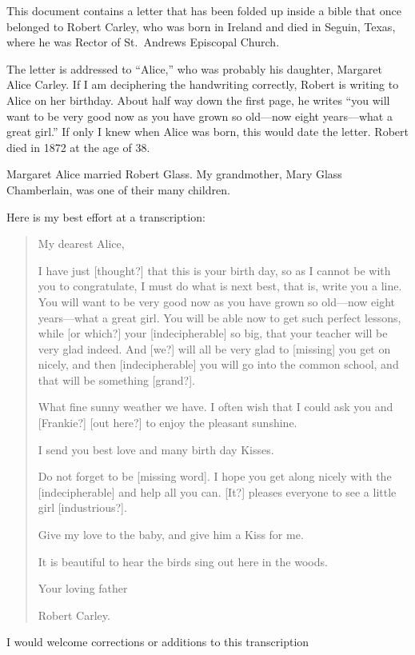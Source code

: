 \documentclass[12pt]{article}
\begin{document}
This document contains a letter that has been folded up inside a bible
that once belonged to Robert Carley, who was born in Ireland and died
in Seguin, Texas, where he was Rector of St.\ Andrews Episcopal
Church.

The letter is addressed to ``Alice,'' who was probably his daughter,
Margaret Alice Carley. If I am deciphering the handwriting correctly,
Robert is writing to Alice on her birthday. About half way down the
first page, he writes ``you will want to be very good now as you have
grown so old---now eight years---what a great girl.'' If only I knew
when Alice was born, this would date the letter. Robert died in 1872
at the age of 38.

Margaret Alice married Robert Glass. My grandmother, Mary Glass
Chamberlain, was one of their many children.

Here is my best effort at a transcription:
\begin{quotation}
  \noindent My dearest Alice,

  I have just [thought?] that this is your birth day, so as I cannot
  be with you to congratulate, I must do what is next best, that is,
  write you a line. You will want to be very good now as you have
  grown so old---now eight years---what a great girl. You will be able
  now to get such perfect lessons, while [or which?] your
  [indecipherable] so big, that your teacher will be very glad
  indeed. And [we?] will all be very glad to [missing] you get on
  nicely, and then [indecipherable] you will go into the common
  school, and that will be something [grand?].

  What fine sunny weather we have. I often wish that I could ask you
  and [Frankie?] [out here?] to enjoy the pleasant sunshine.

  I send you best love and many birth day Kisses.

  Do not forget to be [missing word]. I hope you get along nicely with
  the [indecipherable] and help all you can. [It?] pleases everyone to
  see a little girl [industrious?].

  Give my love to the baby, and give him a Kiss for me.

  It is beautiful to hear the birds sing out here in the woods.

  Your loving father

  \mbox{}\hfill Robert Carley.
\end{quotation}
I would welcome corrections or additions to this transcription
\end{document}
